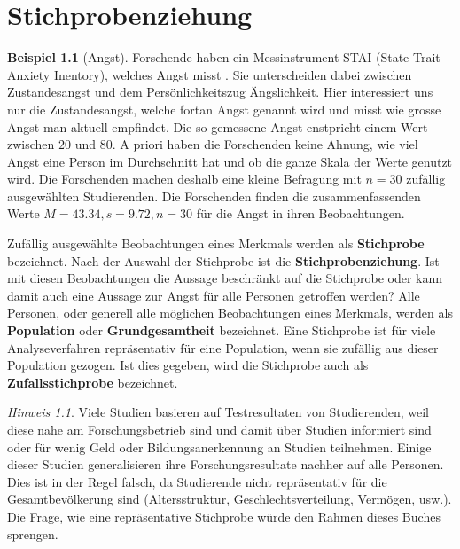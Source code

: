 \documentclass[
]{book}
\theoremstyle{definition}
\theoremstyle{definition}
\newtheorem{example}{Beispiel}[chapter]
\theoremstyle{definition}
\theoremstyle{definition}
\theoremstyle{remark}
\newtheorem*{remark}{Hinweis}
\begin{document}
\chapter{Stichprobenziehung}\label{stichprobenziehung}

\begin{example}[Angst]
\protect\hypertarget{exm:angst}{}\label{exm:angst}Forschende haben ein Messinstrument STAI (State-Trait Anxiety Inentory), welches Angst misst \citep{spielberger1983manual}. Sie unterscheiden dabei zwischen Zustandesangst und dem Persönlichkeitszug Ängslichkeit. Hier interessiert uns nur die Zustandesangst, welche fortan Angst genannt wird und misst wie grosse Angst man aktuell empfindet. Die so gemessene Angst enstpricht einem Wert zwischen \(20\) und \(80\). A priori haben die Forschenden keine Ahnung, wie viel Angst eine Person im Durchschnitt hat und ob die ganze Skala der Werte genutzt wird. Die Forschenden machen deshalb eine kleine Befragung mit \(n =30\) zufällig ausgewählten Studierenden. Die Forschenden finden die zusammenfassenden Werte \(M=43.34, s = 9.72, n = 30\) für die Angst in ihren Beobachtungen.
\end{example}

\label{customdef-stichprobe}{Zufällig ausgewählte Beobachtungen eines Merkmals werden als \textbf{Stichprobe} bezeichnet.} \label{customdef-stichprobenziehung}{Nach der Auswahl der Stichprobe ist die \textbf{Stichprobenziehung}.} Ist mit diesen Beobachtungen die Aussage beschränkt auf die Stichprobe oder kann damit auch eine Aussage zur Angst für alle Personen getroffen werden? \label{customdef-population}{Alle Personen, oder generell alle möglichen Beobachtungen eines Merkmals, werden als \textbf{Population}} \label{customdef-grundgesamtheit}{oder \textbf{Grundgesamtheit} bezeichnet}. \label{customdef-zufallsstichprobe}{Eine Stichprobe ist für viele Analyseverfahren repräsentativ für eine Population, wenn sie zufällig aus dieser Population gezogen. Ist dies gegeben, wird die Stichprobe auch als \textbf{Zufallsstichprobe} bezeichnet.}

\begin{remark}
Viele Studien basieren auf Testresultaten von Studierenden, weil diese nahe am Forschungsbetrieb sind und damit über Studien informiert sind oder für wenig Geld oder Bildungsanerkennung an Studien teilnehmen. Einige dieser Studien generalisieren ihre Forschungsresultate nachher auf alle Personen. Dies ist in der Regel falsch, da Studierende nicht repräsentativ für die Gesamtbevölkerung sind (Altersstruktur, Geschlechtsverteilung, Vermögen, usw.). Die Frage, wie eine repräsentative Stichprobe würde den Rahmen dieses Buches sprengen.
\end{remark}
\end{document}
